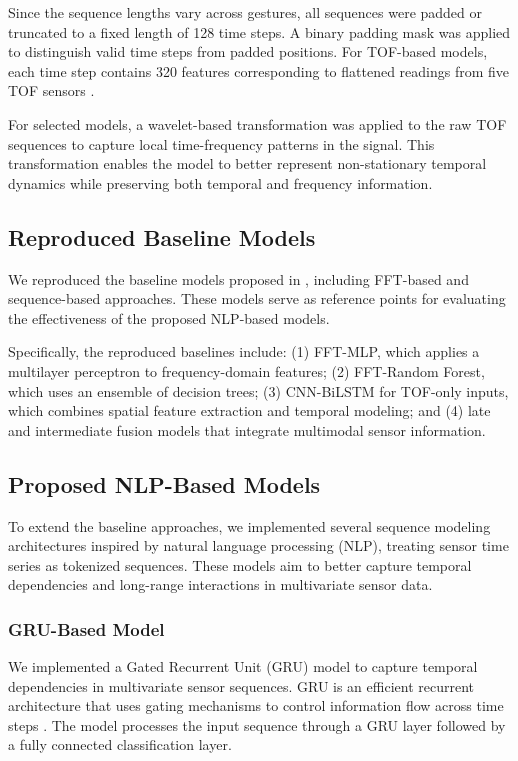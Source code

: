 \documentclass[conference]{IEEEtran}
\begin{document}
Since the sequence lengths vary across gestures, all sequences were padded or truncated to a fixed length of 128 time steps. A binary padding mask was applied to distinguish valid time steps from padded positions. For TOF-based models, each time step contains 320 features corresponding to flattened readings from five TOF sensors \cite{harris2020array}.

For selected models, a wavelet-based transformation was applied to the raw TOF sequences to capture local time-frequency patterns in the signal. This transformation enables the model to better represent non-stationary temporal dynamics while preserving both temporal and frequency information.

\subsection{Reproduced Baseline Models}

We reproduced the baseline models proposed in \cite{zhang2025bfrb}, including FFT-based and sequence-based approaches. These models serve as reference points for evaluating the effectiveness of the proposed NLP-based models.

Specifically, the reproduced baselines include: (1) FFT-MLP, which applies a multilayer perceptron to frequency-domain features; (2) FFT-Random Forest, which uses an ensemble of decision trees; (3) CNN-BiLSTM for TOF-only inputs, which combines spatial feature extraction and temporal modeling; and (4) late and intermediate fusion models that integrate multimodal sensor information.

\subsection{Proposed NLP-Based Models}

To extend the baseline approaches, we implemented several sequence modeling architectures inspired by natural language processing (NLP), treating sensor time series as tokenized sequences. These models aim to better capture temporal dependencies and long-range interactions in multivariate sensor data.

\subsubsection{GRU-Based Model}

We implemented a Gated Recurrent Unit (GRU) model to capture temporal dependencies in multivariate sensor sequences. GRU is an efficient recurrent architecture that uses gating mechanisms to control information flow across time steps \cite{cho2014gru}. The model processes the input sequence through a GRU layer followed by a fully connected classification layer.
\end{document}

